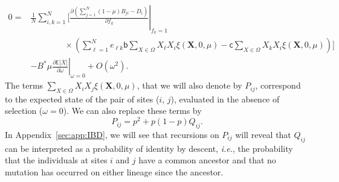 \documentclass[11pt, letterpaper]{article}
\newcommand{\ie}{\textit{i.e.}}
\newcommand{\deriv}[2]{\partial_{#2}\!{#1}\,}
\newcommand{\derivv}[3]{\left.\frac{\partial #1}{\partial #2}\right |_{#3=0}} %
\newcommand{\derivvv}[3]{\left.\frac{\partial #1}{\partial #2}\right |_{#3}} %
\newcommand{\Esp}[1]{\mathbb{E}\big[ #1\big]}%
\newcommand{\bigO}[1]{O\left( #1 \right)}
\newcommand{\appname}[0]{Appendix}
\newcommand{\bb}{\mathsf{b}}
\newcommand{\cc}{\mathsf{c}}
\begin{document}
%
\begin{equation}\label{eq:weaksel1}
\begin{split}
0 =&  \frac{1}{N}  \sum_{i,k=1}^N \Bigg[  \derivvv{\left(\sum_{j=1}^N (1-\mu) B_{ji}  - D_i \right)}{f_k}{f_k=1}  \\ 
%
&  \qquad \qquad \times \left( \sum_{\ell =1}^N e_{\ell k} \bb \sum_{X\in \Omega} X_{\ell} X_i \xi(\mathbf{X}, 0, \mu) - \cc \sum_{X\in \Omega} X_k X_i \xi(\mathbf{X}, 0, \mu) \right)  \Bigg] \\ 
%
%
%
& - B^* \mu \derivv{\Esp{\overline{X}}}{\omega}{\omega} 
%
+ \bigO{\omega^2}. 
\end{split}
\end{equation}
The terms $\sum_{X\in\Omega} X_i X_j \xi(\mathbf{X}, 0, \mu)$, that we will also denote by $P_{ij}$, correspond to the expected state of the pair of sites ($i$, $j$), evaluated in the absence of selection ($\omega = 0$). We can also replace these terms by 
\begin{equation}\label{eq:QP}
P_{ij} = p^2 + p (1-p) Q_{ij}.
\end{equation}
In \appname~\ref{sec:app:IBD}, we will see that recursions on $P_{ij}$ will reveal that $Q_{ij}$ can be interpreted as a probability of identity by descent, \ie, the probability that the individuals at sites $i$ and $j$ have a common ancestor and that no mutation has occurred on either lineage since the ancestor. 
\end{document}
